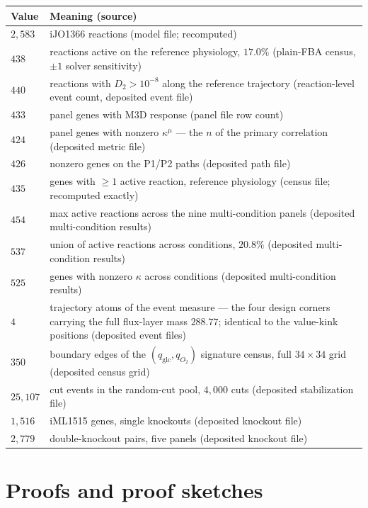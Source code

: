 \documentclass[11pt,a4paper]{article}
\theoremstyle{plain}
\theoremstyle{definition}
\theoremstyle{remark}
\newcommand{\kmu}{\kappa^{\mu}}
\begin{document}
\begin{tabularx}{\textwidth}{l>{\raggedright\arraybackslash}X}
\toprule
\textbf{Value} & \textbf{Meaning (source)} \\
\midrule
$2{,}583$ & iJO1366 reactions (model file; recomputed) \\
$438$ & reactions active on the reference physiology, $17.0\%$ (plain-FBA census, $\pm 1$ solver sensitivity) \\
$440$ & reactions with $D_2 > 10^{-8}$ along the reference trajectory (reaction-level event count, deposited event file) \\
$433$ & panel genes with M3D response (panel file row count) \\
$424$ & panel genes with nonzero $\kmu$ --- the $n$ of the primary correlation (deposited metric file) \\
$426$ & nonzero genes on the P1/P2 paths (deposited path file) \\
$435$ & genes with $\ge 1$ active reaction, reference physiology (census file; recomputed exactly) \\
$454$ & max active reactions across the nine multi-condition panels (deposited multi-condition results) \\
$537$ & union of active reactions across conditions, $20.8\%$ (deposited multi-condition results) \\
$525$ & genes with nonzero $\kappa$ across conditions (deposited multi-condition results) \\
$4$ & trajectory atoms of the event measure --- the four design corners carrying the full flux-layer mass $288.77$; identical to the value-kink positions (deposited event files) \\
$350$ & boundary edges of the $(q_{\mathrm{glc}}, q_{O_2})$ signature census, full $34\times34$ grid (deposited census grid) \\
$25{,}107$ & cut events in the random-cut pool, $4{,}000$ cuts (deposited stabilization file) \\
$1{,}516$ & iML1515 genes, single knockouts (deposited knockout file) \\
$2{,}779$ & double-knockout pairs, five panels (deposited knockout file) \\
\bottomrule
\end{tabularx}

\section{Proofs and proof sketches}\label{sec:proofs}
\end{document}
